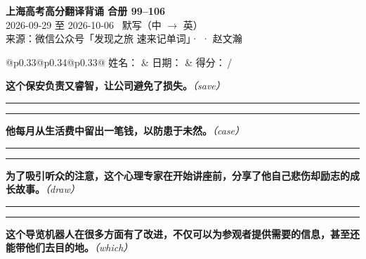 \documentclass[11pt,a4paper]{article}
\newcommand{\num}[1]{\makebox[1.9em][r]{#1.}\hspace{0.3em}}
\newcommand{\wline}{\noindent\rule{\linewidth}{0.4pt}}
\newcommand{\prompt}[1]{\emph{\textcolor{tipblue}{\small（#1）}}}
\begin{document}
\pagestyle{plain}
\begin{center}
{\LARGE\bfseries 上海高考高分翻译背诵 \quad 合册 99–106}\\[0.25em]
{\large 2026-09-29 至 2026-10-06 \quad\ 默写（中 $\to$ 英）}\\[0.35em]
{\footnotesize 来源：微信公众号「发现之旅 速来记单词」·  · 赵文瀚}
\end{center}

\vspace{0.4em}
\noindent\begin{tabular}{@{}p{0.33\textwidth}@{}p{0.34\textwidth}@{}p{0.33\textwidth}@{}}
姓名：\underline{\hspace{2.0cm}} & 日期：\underline{\hspace{2.0cm}} & 得分：\underline{\hspace{1.4cm}}\,/ \\
\end{tabular}

\vspace{0.5em}

\vspace{0.8em}
\vspace{0.35em}\vspace{0.15em}

\num{1}\textbf{这个保安负责又睿智，让公司避免了损失。}\prompt{save}

\vspace{0.3em}

\wline\vspace{0.3em}
\wline

\num{2}\textbf{他每月从生活费中留出一笔钱，以防患于未然。}\prompt{case}

\vspace{0.3em}

\wline\vspace{0.3em}
\wline

\num{3}\textbf{为了吸引听众的注意，这个心理专家在开始讲座前，分享了他自己悲伤却励志的成长故事。}\prompt{draw}

\vspace{0.3em}

\wline\vspace{0.3em}
\wline

\num{4}\textbf{这个导览机器人在很多方面有了改进，不仅可以为参观者提供需要的信息，甚至还能带他们去目的地。}\prompt{which}
\end{document}
